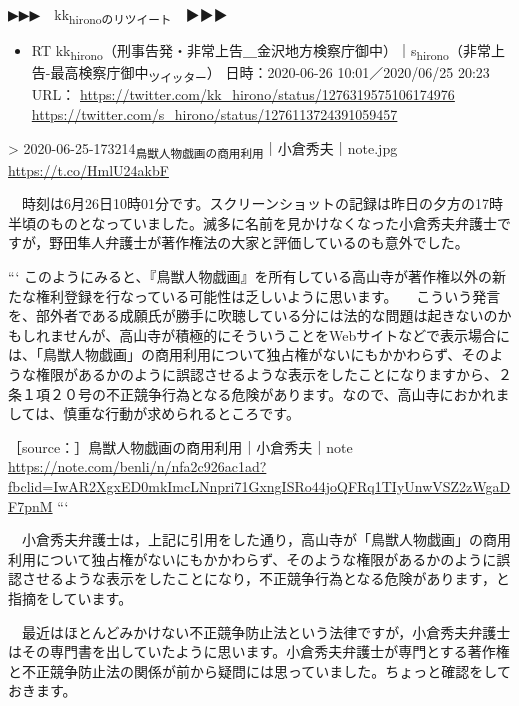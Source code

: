 \documentclass[]{ltjarticle}
\begin{document}
▶▶▶　kk\textsubscript{hironoのリツイート}　▶▶▶  

\begin{itemize}
\item RT kk\textsubscript{hirono}（刑事告発・非常上告＿金沢地方検察庁御中）｜s\textsubscript{hirono}（非常上告-最高検察庁御中\textsubscript{ツイッター}） 日時：2020-06-26 10:01／2020/06/25 20:23 URL： \url{https://twitter.com/kk\_hirono/status/1276319575106174976} \url{https://twitter.com/s\_hirono/status/1276113724391059457}
\end{itemize}

> 2020-06-25-173214\textsubscript{鳥獣人物戯画の商用利用}｜小倉秀夫｜note.jpg \url{https://t.co/HmlU24akbF}  

　時刻は6月26日10時01分です。スクリーンショットの記録は昨日の夕方の17時半頃のものとなっていました。滅多に名前を見かけなくなった小倉秀夫弁護士ですが，野田隼人弁護士が著作権法の大家と評価しているのも意外でした。

```
このようにみると、『鳥獣人物戯画』を所有している高山寺が著作権以外の新たな権利登録を行なっている可能性は乏しいように思います。
　こういう発言を、部外者である成願氏が勝手に吹聴している分には法的な問題は起きないのかもしれませんが、高山寺が積極的にそういうことをWebサイトなどで表示場合には、「鳥獣人物戯画」の商用利用について独占権がないにもかかわらず、そのような権限があるかのように誤認させるような表示をしたことになりますから、２条１項２０号の不正競争行為となる危険があります。なので、高山寺におかれましては、慎重な行動が求められるところです。

［source：］鳥獣人物戯画の商用利用｜小倉秀夫｜note \url{https://note.com/benli/n/nfa2c926ac1ad?fbclid=IwAR2XgxED0mkImcLNnpri71GxngISRo44joQFRq1TIyUnwVSZ2zWgaDF7pnM}
```

　小倉秀夫弁護士は，上記に引用をした通り，高山寺が「鳥獣人物戯画」の商用利用について独占権がないにもかかわらず、そのような権限があるかのように誤認させるような表示をしたことになり，不正競争行為となる危険があります，と指摘をしています。

　最近はほとんどみかけない不正競争防止法という法律ですが，小倉秀夫弁護士はその専門書を出していたように思います。小倉秀夫弁護士が専門とする著作権と不正競争防止法の関係が前から疑問には思っていました。ちょっと確認をしておきます。
\end{document}
